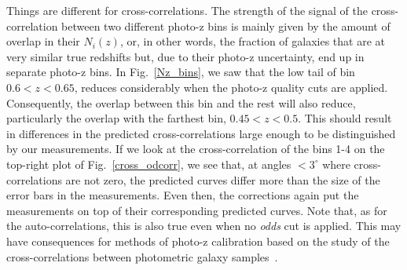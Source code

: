 Things are different for cross-correlations. The strength of the signal of the cross-correlation between two different photo-z bins is mainly given by the amount of overlap in their $N_i(z)$, or, in other words, the fraction of galaxies that are at very similar true redshifts but, due to their photo-z uncertainty, end up in separate photo-z bins. In Fig.~\ref{Nz_bins}, we saw that the low tail of bin $0.6<z<0.65$, reduces considerably when the photo-z quality cuts are applied. Consequently, the overlap between this bin and the rest will also reduce, particularly the overlap with the farthest bin, $0.45<z<0.5$. This should result in differences in the predicted cross-correlations large enough to be distinguished by our measurements. If we look at the cross-correlation of the bins 1-4 on the top-right plot of Fig.~\ref{cross_odcorr}, we see that, at angles $<3^\circ$ where cross-correlations are not zero, the predicted curves differ more than the size of the error bars in the measurements. Even then, the corrections again put the measurements on top of their corresponding predicted curves. Note that, as for the auto-correlations, this is also true even when no {\em odds} cut is applied. This may have consequences for methods of photo-z calibration based on the study of the cross-correlations between photometric galaxy samples~\citep{Benjamin2010}.
